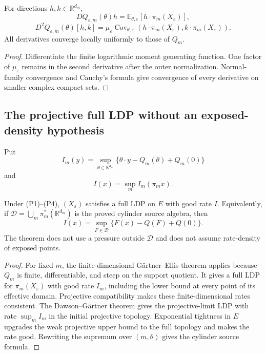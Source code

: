 \begin{proposition}
\label{prop:r6-d1-normalization}
For directions \(h,k\in\mathbb R^{d_m}\),
\[
DQ_{\varepsilon,m}(\theta)h
=\mathbb E_{\theta,\varepsilon}[h\cdot\pi_m(X_\varepsilon)],
\]
\[
D^2Q_{\varepsilon,m}(\theta)[h,k]
=\mu_\varepsilon
\operatorname{Cov}_{\theta,\varepsilon}
(h\cdot\pi_m(X_\varepsilon),
 k\cdot\pi_m(X_\varepsilon)).
\]
All derivatives converge locally uniformly to those of \(Q_m\).
\end{proposition}

\begin{proof}
Differentiate the finite logarithmic moment generating function.  One factor
of \(\mu_\varepsilon\) remains in the second derivative after the outer
normalization.  Normal-family convergence and Cauchy's formula give convergence
of every derivative on smaller complex compact sets.
\end{proof}

\subsection{The projective full LDP without an exposed-density hypothesis}

Put
\[
I_m(y)=\sup_{\theta\in\mathbb R^{d_m}}
\{\theta\cdot y-Q_m(\theta)+Q_m(0)\}
\]
and
\[
I(x)=\sup_m I_m(\pi_mx).
\]

\begin{theorem}
\label{thm:r6-d1-projective}
Under (P1)--(P4), \((X_\varepsilon)\) satisfies a full LDP on \(E\) with good
rate \(I\).  Equivalently, if
\(\mathcal D=\bigcup_m\pi_m^*(\mathbb R^{d_m})\) is the proved cylinder source
algebra, then
\[
I(x)=\sup_{F\in\mathcal D}
\{F(x)-Q(F)+Q(0)\}.
\]
The theorem does not use a pressure outside \(\mathcal D\) and does not assume
rate-density of exposed points.
\end{theorem}

\begin{proof}
For fixed \(m\), the finite-dimensional Gärtner--Ellis theorem applies because
\(Q_m\) is finite, differentiable, and steep on the support quotient.  It
gives a full LDP for \(\pi_m(X_\varepsilon)\) with good rate \(I_m\), including
the lower bound at every point of its effective domain.  Projective
compatibility makes these finite-dimensional rates consistent.  The
Dawson--Gärtner theorem gives the projective-limit LDP with rate
\(\sup_mI_m\) in the initial projective topology.  Exponential tightness in
\(E\) upgrades the weak projective upper bound to the full topology and makes
the rate good.  Rewriting the supremum over \((m,\theta)\) gives the cylinder
source formula.
\end{proof}

